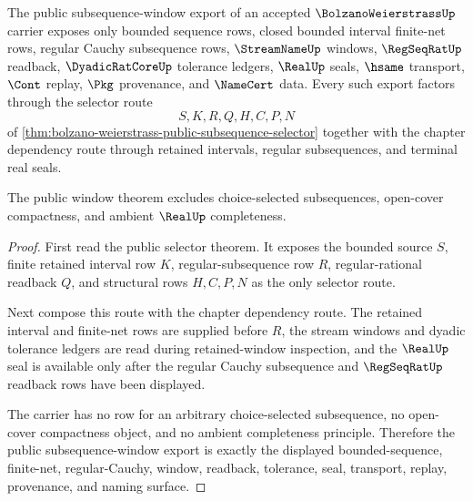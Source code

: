 \begin{theorem}
\label{thm:bolzano-weierstrass-subsequence-window-publicity}
The public subsequence-window export of an accepted $\BolzanoWeierstrassUp$ carrier exposes only bounded sequence rows, closed bounded interval finite-net rows, regular Cauchy subsequence rows, $\StreamNameUp$ windows, $\RegSeqRatUp$ readback, $\DyadicRatCoreUp$ tolerance ledgers, $\RealUp$ seals, $\hsame$ transport, $\Cont$ replay, $\Pkg$ provenance, and $\NameCert$ data. Every such export factors through the selector route
$$
S,K,R,Q,H,C,P,N
$$
of \autoref{thm:bolzano-weierstrass-public-subsequence-selector} together with the chapter dependency route through retained intervals, regular subsequences, and terminal real seals.

The public window theorem excludes choice-selected subsequences, open-cover compactness, and ambient $\RealUp$ completeness.
\end{theorem}
\begin{proof}
First read the public selector theorem. It exposes the bounded source $S$, finite retained interval row $K$, regular-subsequence row $R$, regular-rational readback $Q$, and structural rows $H,C,P,N$ as the only selector route.

Next compose this route with the chapter dependency route. The retained interval and finite-net rows are supplied before $R$, the stream windows and dyadic tolerance ledgers are read during retained-window inspection, and the $\RealUp$ seal is available only after the regular Cauchy subsequence and $\RegSeqRatUp$ readback rows have been displayed.

The carrier has no row for an arbitrary choice-selected subsequence, no open-cover compactness object, and no ambient completeness principle. Therefore the public subsequence-window export is exactly the displayed bounded-sequence, finite-net, regular-Cauchy, window, readback, tolerance, seal, transport, replay, provenance, and naming surface.
\end{proof}

